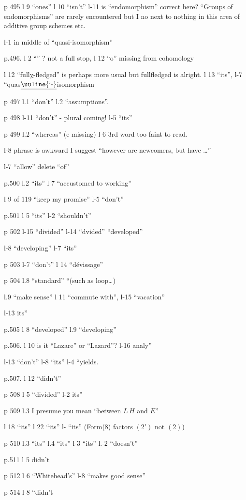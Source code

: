 
p 495 l 9 ``ones'' \quad l 10 ``isn't'' \quad l-11 is ``endomorphism'' correct here? ``Groups of endomorphisms'' are rarely encountered but I no next to nothing in this area of additive group schemes etc.

l-1 \unsure{-|$\leftarrow$} in middle of ``quasi-isomorphism''

p.496. l 2 ``'' ? not a full stop, \quad l 12 ``o'' missing from cohomology

l 12 ``full\uline{y}-fledged'' is perhaps more usual but fullfledged is alright. \quad l 13 ``its'', \quad l-7 ``quas$\underline{\text{\uuline{i-}}}$isomorphism

p 497 l.1 ``don't'' \quad l.2 ``assumptions''.

p 498 l-11 ``don't'' - plural coming! \quad l-5 ``its''


p 499 l.2 ``whereas'' (e missing) \quad l 6 3rd word too faint to read.

l-8 phrase is awkward I suggest ``however are newcomers, but have \ldots{}''

l-7 ``allow'' delete ``of''

p.500 l.2 ``its'' \quad l 7 ``accustomed to working''

l 9 of 119 ``keep my promise'' \quad l-5 ``don't''

p.501 l 5 ``its'' \quad l-2 ``shouldn't''

p 502 l-15 ``divided'' \quad l-14 ``dvided'' ``developed''

l-8 ``developing'' \quad l-7 ``its''

p 503 l-7 ``don't'' \quad l 14 ``dévissage''

p 504 l.8 ``standard'' \quad ``(such as loop\ldots{})

l.9 ``make sense'' \quad l 11 ``commute with'', \quad l-15 ``vacation''

 l-13 its''

p.505 l 8 ``developed'' \quad l.9 ``developing''

p.506. l 10 is it ``Lazare'' or ``Lazard''? \quad l-16 analy''

l-13 ``don't'' \quad l-8 ``its'' \quad l-4 ``yields.

p.507. l 12 ``didn't''

p 508 l 5 ``divided'' \quad l-2 its''

p 509 l.3 I presume you mean ``between $L\,H$ and $E$''

l 18 ``its'' \quad l 22 ``its'' \quad l- ``its'' \quad (Form(8) factors $(2')$ not $(2)$)

p 510 l.3 ``its'' \quad l.4 ``its'' \quad l-3 ``its'' \quad l.-2 ``doesn't''

p.511 l 5 didn't

p 512 l 6 ``Whitehead's'' \quad l-8 ``makes good sense''

p 514 l-8 ``didn't
